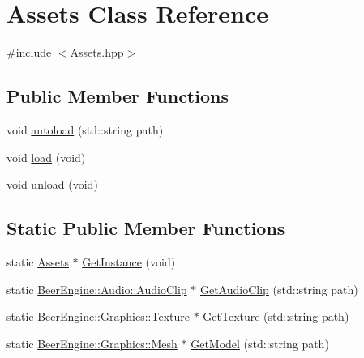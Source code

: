 \hypertarget{class_assets}{}\section{Assets Class Reference}
\label{class_assets}


{\ttfamily \#include $<$Assets.\+hpp$>$}

\subsection*{Public Member Functions}
\begin{DoxyCompactItemize}
\item 
void \mbox{\hyperlink{class_assets_a4e848364b8e24434ec5be20c28106dbd}{autoload}} (std\+::string path)
\item 
void \mbox{\hyperlink{class_assets_a39f25e7a1853ac52ca5fcfdb676ace04}{load}} (void)
\item 
void \mbox{\hyperlink{class_assets_a7c382091adff219150cbd067d646fe16}{unload}} (void)
\end{DoxyCompactItemize}
\subsection*{Static Public Member Functions}
\begin{DoxyCompactItemize}
\item 
static \mbox{\hyperlink{class_assets}{Assets}} $\ast$ \mbox{\hyperlink{class_assets_a1ec0f88affb09ed018d3f8026f64c15b}{Get\+Instance}} (void)
\item 
static \mbox{\hyperlink{class_beer_engine_1_1_audio_1_1_audio_clip}{Beer\+Engine\+::\+Audio\+::\+Audio\+Clip}} $\ast$ \mbox{\hyperlink{class_assets_a8f344169002807c95cb543d1116ea2bb}{Get\+Audio\+Clip}} (std\+::string path)
\item 
static \mbox{\hyperlink{class_beer_engine_1_1_graphics_1_1_texture}{Beer\+Engine\+::\+Graphics\+::\+Texture}} $\ast$ \mbox{\hyperlink{class_assets_a1dc713408638d18566ec35221a0ede24}{Get\+Texture}} (std\+::string path)
\item 
static \mbox{\hyperlink{class_beer_engine_1_1_graphics_1_1_mesh}{Beer\+Engine\+::\+Graphics\+::\+Mesh}} $\ast$ \mbox{\hyperlink{class_assets_a2fcfb2c8c5a0ca4630230f4086b010f6}{Get\+Model}} (std\+::string path)
\end{DoxyCompactItemize}
